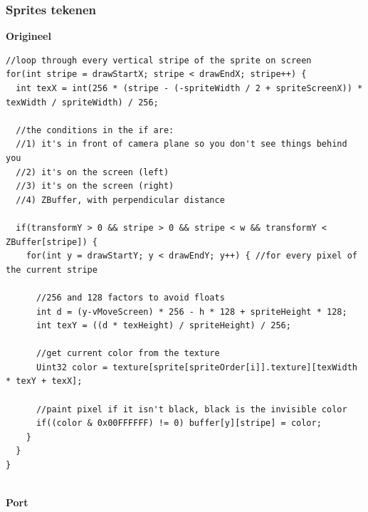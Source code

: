 \documentclass{report}
\begin{document}
      \subsubsection{Sprites tekenen} %
      \label{ssub:sprites_tekenen}
\textbf{Origineel}
\begin{verbatim}
//loop through every vertical stripe of the sprite on screen
for(int stripe = drawStartX; stripe < drawEndX; stripe++) {
  int texX = int(256 * (stripe - (-spriteWidth / 2 + spriteScreenX)) * texWidth / spriteWidth) / 256;

  //the conditions in the if are:
  //1) it's in front of camera plane so you don't see things behind you
  //2) it's on the screen (left)
  //3) it's on the screen (right)
  //4) ZBuffer, with perpendicular distance

  if(transformY > 0 && stripe > 0 && stripe < w && transformY < ZBuffer[stripe]) {
    for(int y = drawStartY; y < drawEndY; y++) { //for every pixel of the current stripe

      //256 and 128 factors to avoid floats
      int d = (y-vMoveScreen) * 256 - h * 128 + spriteHeight * 128;
      int texY = ((d * texHeight) / spriteHeight) / 256;

      //get current color from the texture
      Uint32 color = texture[sprite[spriteOrder[i]].texture][texWidth * texY + texX];

      //paint pixel if it isn't black, black is the invisible color
      if((color & 0x00FFFFFF) != 0) buffer[y][stripe] = color;
    }
  }
}

\end{verbatim}
\\
\textbf{Port}
\end{document}

